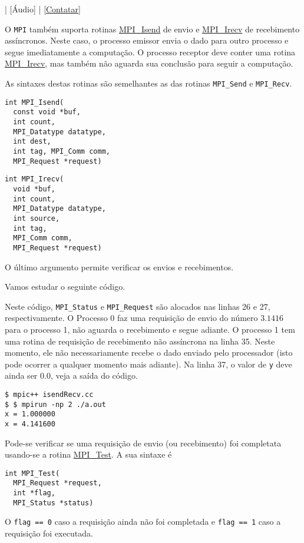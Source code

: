 \begin{flushright}
  [Vídeo] | [Áudio] | \href{https://phkonzen.github.io/notas/contato.html}{[Contatar]}
\end{flushright}

O \verb+MPI+ também suporta rotinas \href{https://www.open-mpi.org/doc/current/man3/MPI_Isend.3.php}{MPI\_Isend} de envio e \href{https://www.open-mpi.org/doc/current/man3/MPI_Irecv.3.php}{MPI\_Irecv} de recebimento assíncronos. Neste caso, o processo emissor envia o dado para outro processo e segue imediatamente a computação. O processo receptor deve conter uma rotina \href{https://www.open-mpi.org/doc/current/man3/MPI_Irecv.3.php}{MPI\_Irecv}, mas também não aguarda sua conclusão para seguir a computação.

As sintaxes destas rotinas são semelhantes as das rotinas \verb+MPI_Send+ e \verb+MPI_Recv+.

\begin{verbatim}
int MPI_Isend(
  const void *buf, 
  int count, 
  MPI_Datatype datatype, 
  int dest,
  int tag, MPI_Comm comm, 
  MPI_Request *request)
\end{verbatim}

\begin{verbatim}
int MPI_Irecv(
  void *buf, 
  int count, 
  MPI_Datatype datatype,
  int source, 
  int tag, 
  MPI_Comm comm, 
  MPI_Request *request)
\end{verbatim}
O último argumento permite verificar os envios e recebimentos.

Vamos estudar o seguinte código.



Neste código, \verb+MPI_Status+ e \verb+MPI_Request+ são alocados nas linhas 26 e 27, respectivamente. O Processo 0 faz uma requisição de envio do número $3.1416$ para o processo 1, não aguarda o recebimento e segue adiante. O processo 1 tem uma rotina de requisição de recebimento não assíncrona na linha 35. Neste momento, ele não necessariamente recebe o dado enviado pelo processador (isto pode ocorrer a qualquer momento mais adiante). Na linha 37, o valor de \verb+y+ deve ainda ser $0.0$, veja a saída do código.

\begin{verbatim}
$ mpic++ isendRecv.cc
$ $ mpirun -np 2 ./a.out
x = 1.000000
x = 4.141600
\end{verbatim}

Pode-se verificar se uma requisição de envio (ou recebimento) foi completata usando-se a rotina \href{https://www.open-mpi.org/doc/current/man3/MPI\_Test.3.php}{MPI\_Test}. A sua sintaxe é
\begin{verbatim}
int MPI_Test(
  MPI_Request *request, 
  int *flag, 
  MPI_Status *status)
\end{verbatim}
O \verb+flag == 0+ caso a requisição ainda não foi completada e \verb+flag == 1+ caso a requisição foi executada.

